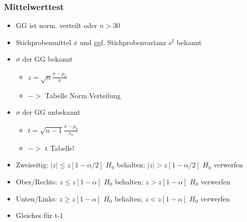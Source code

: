 \documentclass[a4paper]{article}
\begin{document}
\begin{landscape}
\begin{multicols}{4}
        \subsubsection*{Mittelwerttest}
        \begin{itemize}[noitemsep,nolistsep,leftmargin=*]
            \item GG ist norm. verteilt oder $n > 30$
            \item Stichprobenmittel $\overline{x}$ und ggf. Stichprobenvarianz $s^2$ bekannt
            \item $\sigma$ der GG bekannt
            \begin{itemize}[noitemsep,nolistsep,leftmargin=*]
                \item $z = \sqrt{n}\frac{\overline{x}-\mu_0}{\sigma}$
                \item $->$ Tabelle Norm.Verteilung
            \end{itemize}
            \item $\sigma$ der GG unbekannt
            \begin{itemize}[noitemsep,nolistsep,leftmargin=*]
                \item $t = \sqrt{n-1}\frac{\overline{x}-\mu_0}{s_n}$
                \item $->$ t Tabelle!
            \end{itemize}
            \item Zweiseitig: $|z|  \leq z[1-\alpha/2]$ $H_0$ behalten; $|z| > z[1-\alpha/2]$ $H_0$ verwerfen
            \item Ober/Rechts: $z  \leq z[1-\alpha]$ $H_0$ behalten; $z > z[1-\alpha]$ $H_0$ verwerfen
            \item Unten/Links: $z  \geq z[1-\alpha]$ $H_0$ behalten; $z < z[1-\alpha]$ $H_0$ verwerfen
            \item Gleiches für t-1
        \end{itemize}

\end{multicols}
\end{landscape}
\end{document}
